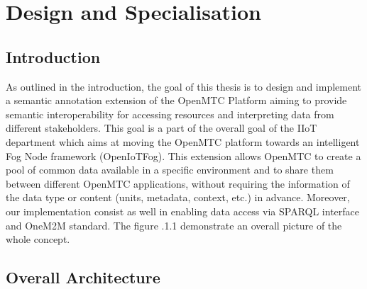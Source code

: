 \cleardoublepage
\chapter{Design and Specialisation}\label{sec:contrib1}\minitoc\vspace{.5cm}

\section{Introduction}
As outlined in the introduction, the goal of this thesis is to design and implement a semantic annotation extension of the OpenMTC Platform aiming to provide semantic interoperability for accessing resources and interpreting data from different stakeholders. This goal is a part of the overall goal of the IIoT department which aims at moving the OpenMTC platform towards an intelligent Fog Node framework (OpenIoTFog).
This extension allows OpenMTC to create a pool of common data available in a specific environment and to share them between different OpenMTC applications, without requiring the information of the data type or content (units, metadata, context, etc.) in advance. Moreover, our implementation consist as well in enabling data access via SPARQL interface and OneM2M standard. The figure .1.1 demonstrate an overall picture of the whole concept.\par


\section{Overall Architecture}

